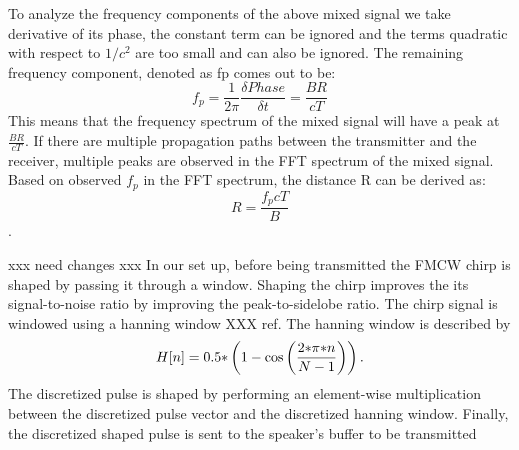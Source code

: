 To analyze the frequency components of the above mixed signal we take derivative of its phase, the constant term can be ignored and the terms quadratic with respect to $1/c^2$ are too small and
can also be ignored. The remaining frequency component, denoted as fp comes out to be:
$$f_p = \frac{1} {2\pi} \frac{\delta Phase}{\delta t} = \frac{BR}{cT}$$
This means that the frequency spectrum of the mixed signal will have a peak at $\frac {BR}{cT}$. If there are multiple propagation paths between the transmitter and the receiver, multiple peaks are observed in the FFT spectrum of the mixed signal. 
Based on observed $f_p$ in the FFT spectrum, the distance R can be derived as:
$$R = \frac{f_pcT}{B}$$ .

xxx need changes xxx
In our set up, before being transmitted the FMCW chirp is shaped by passing it through a window. Shaping the chirp improves the its signal-to-noise ratio by improving the peak-to-sidelobe ratio. 
The chirp signal is windowed using a hanning window XXX ref. The hanning window is described by
\begin{equation}H[n] = 0.5{\ast}\left(1-{\rm{ cos}}\left(\frac{2{\ast}\pi{\ast}n}{N-1}\right)\right).\end{equation}
The discretized pulse is shaped by performing an element-wise multiplication between the discretized pulse vector and the discretized hanning window. Finally, the discretized shaped pulse is sent to the speaker’s buffer to be transmitted
